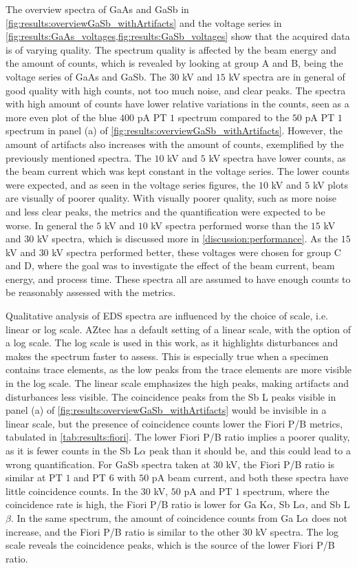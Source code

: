 The overview spectra of GaAs and GaSb in \cref{fig:results:overviewGaSb_withArtifacts} and the voltage series in \cref{fig:results:GaAs_voltages,fig:results:GaSb_voltages} show that the acquired data is of varying quality.
The spectrum quality is affected by the beam energy and the amount of counts, which is revealed by looking at group A and B, being the voltage series of GaAs and GaSb.
The $30$ kV and $15$ kV spectra are in general of good quality with high counts, not too much noise, and clear peaks.
The spectra with high amount of counts have lower relative variations in the counts, seen as a more even plot of the blue $400$ pA PT $1$ spectrum compared to the $50$ pA PT $1$ spectrum in panel (a) of \cref{fig:results:overviewGaSb_withArtifacts}.
However, the amount of artifacts also increases with the amount of counts, exemplified by the previously mentioned spectra.
The $10$ kV and $5$ kV spectra have lower counts, as the beam current which was kept constant in the voltage series.
The lower counts were expected, and as seen in the voltage series figures, the $10$ kV and $5$ kV plots are visually of poorer quality.
With visually poorer quality, such as more noise and less clear peaks, the metrics and the quantification were expected to be worse.
In general the $5$ kV and $10$ kV spectra performed worse than the $15$ kV and $30$ kV spectra, which is discussed more in \cref{discussion:performance}.
As the $15$ kV and $30$ kV spectra performed better, these voltages were chosen for group C and D, where the goal was to investigate the effect of the beam current, beam energy, and process time.
These spectra all are assumed to have enough counts to be reasonably assessed with the metrics.


Qualitative analysis of EDS spectra are influenced by the choice of scale, i.e. linear or log scale.
AZtec has a default setting of a linear scale, with the option of a log scale.
The log scale is used in this work, as it highlights disturbances and makes the spectrum faster to assess.
This is especially true when a specimen contains trace elements, as the low peaks from the trace elements are more visible in the log scale.
The linear scale emphasizes the high peaks, making artifacts and disturbances less visible.
The coincidence peaks from the Sb L peaks visible in panel (a) of \cref{fig:results:overviewGaSb_withArtifacts} would be invisible in a linear scale, but the presence of coincidence counts lower the Fiori P/B metrics, tabulated in \cref{tab:results:fiori}.
The lower Fiori P/B ratio implies a poorer quality, as it is fewer counts in the Sb L$\alpha$ peak than it should be, and this could lead to a wrong quantification.
For GaSb spectra taken at $30$ kV, the Fiori P/B ratio is similar at PT $1$ and PT $6$ with $50$ pA beam current, and both these spectra have little coincidence counts.
In the $30$ kV, $50$ pA and PT $1$ spectrum, where the coincidence rate is high, the Fiori P/B ratio is lower for Ga K$\alpha$, Sb L$\alpha$, and Sb L$\beta$.
In the same spectrum, the amount of coincidence counts from Ga L$\alpha$ does not increase, and the Fiori P/B ratio is similar to the other $30$ kV spectra.
The log scale reveals the coincidence peaks, which is the source of the lower Fiori P/B ratio.


